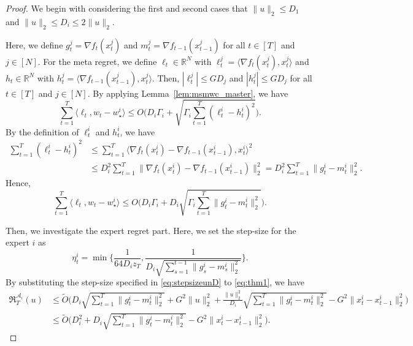 \documentclass{article}
\theoremstyle{plain}
\theoremstyle{definition}
\theoremstyle{remark}
\newcommand{\cA}{\mathcal{A}}
\newcommand{\regret}{\mathfrak{R}}
\renewcommand{\tilde}{\widetilde}
\begin{document}
\begin{proof}
We begin with considering the first and second cases that  $\|u\|_2\leq D_1$ and $\|u\|_2\leq D_i\leq 2\|u\|_2$.

Here, we define $g_t^j=\nabla f_{t}(x_{t}^j)$ and $m_t^j=\nabla f_{t-1}(x_{t-1}^j)$ for all $t\in[T]$ and $j\in [N]$. For the meta regret, we define $\ell_t\in\mathbb{R}^N$ with $\ell_t^j=\langle \nabla f_t(x_t^j),x_t^j\rangle$ and $h_t\in\mathbb{R}^N$ with $h_t^j=\langle \nabla f_{t-1}(x_{t-1}^j),x_t^j\rangle$. Then, $|\ell_t^j|\leq GD_j$ and $|h_t^j|\leq GD_j$ for all $t\in[T]$ and $j\in[N]$. By applying Lemma~\ref{lem:msmwc_master}, we have
\begin{equation*}
\sum_{t=1}^T\langle \ell_t, w_t-w_\star^i\rangle\leq O\Big(D_i\Gamma_i+\sqrt{\Gamma_i\sum_{t=1}^T (\ell_{t}^i-h_t^i)^2}\Big).
\end{equation*}
By the definition of $\ell_t^i$ and $h_t^i$, we have
\begin{align*}
\sum_{t=1}^T(\ell_{t}^{i}-h_{t}^{i})^2&\leq \sum_{t=1}^T\langle \nabla f_t(x_t^i)-\nabla f_{t-1}(x_{t-1}^i),x_t^i\rangle^2\\
&\leq D_i^2\sum_{t=1}^T\|\nabla f_t(x_t^i)-\nabla f_{t-1}(x_{t-1}^i)\|_2^2=D_i^2 \sum_{t=1}^T\|g_t^i-m_t^i\|_2^2.
\end{align*}
Hence,
\begin{equation}\label{eq:metapart}
\sum_{t=1}^T\langle \ell_t, w_t-w_\star^i\rangle\leq O\Big(D_i\Gamma_i+D_i\sqrt{\Gamma_i\sum_{t=1}^T \|g_{t}^i-m_t^i\|_2^2}\Big).
\end{equation}

Then, we investigate the expert regret part. Here, we set the step-size for the expert $i$ as
\begin{equation}\label{eq:stepsizeunD}
\eta_t^i=\min\Big\{\frac{1}{64D_iz_T},\frac{1}{D_i\sqrt{\sum_{s=1}^{t-1}\|g_{s}^i-m_s^i\|_2^2}}\Big\}.
\end{equation}
By substituting the step-size specified in \eqref{eq:stepsizeunD} to \eqref{eq:thm1}, we have
\begin{align}\label{eq:regbaseAi}
\regret_{T}^{\cA_i}(u)&\leq\tilde{O}\Big(D_i\sqrt{\sum_{t=1}^{T}\|g_{t}^i-m_t^i\|_2^2}+G^2\|u\|_2^2+\frac{\|u\|_2^2}{D_i}\sqrt{\sum_{t=1}^{T}\|g_{t}^i-m_t^i\|_2^2}-G^2\|x_t^i-x_{t-1}^i\|_2^2\Big)\nonumber\\
&\leq \tilde{O}\Big(D_i^2+D_i\sqrt{\sum_{t=1}^{T}\|g_{t}^i-m_t^i\|_2^2}-G^2\|x_t^i-x_{t-1}^i\|_2^2\Big).
\end{align}


\end{proof}
\end{document}
